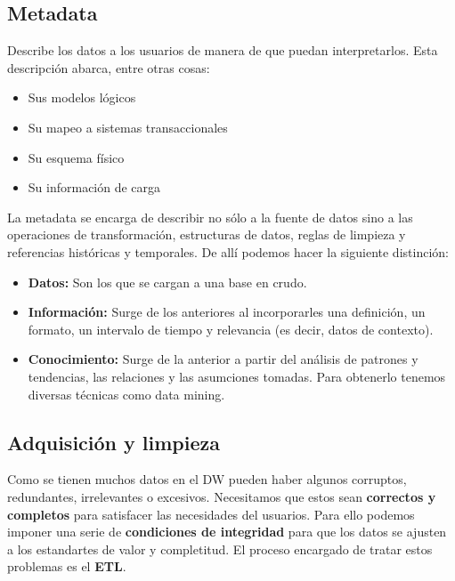 \subsection*{Metadata}
Describe los datos a los usuarios de manera de que puedan interpretarlos. Esta descripción abarca, entre otras cosas:
\begin{itemize}
    \item Sus modelos lógicos
    \item Su mapeo a sistemas transaccionales
    \item Su esquema físico
    \item Su información de carga
\end{itemize}
La metadata se encarga de describir no sólo a la fuente de datos sino a las operaciones de transformación, estructuras de datos, reglas de limpieza y referencias históricas y temporales. De allí podemos hacer la siguiente distinción:
\begin{itemize}
    \item \textbf{Datos:} Son los que se cargan a una base en crudo.
    \item \textbf{Información:} Surge de los anteriores al incorporarles una definición, un formato, un intervalo de tiempo y relevancia (es decir, datos de contexto).
    \item \textbf{Conocimiento:} Surge de la anterior a partir del análisis de patrones y tendencias, las relaciones y las asumciones tomadas. Para obtenerlo tenemos diversas técnicas como data mining.
\end{itemize}

\subsection*{Adquisición y limpieza}
Como se tienen muchos datos en el DW pueden haber algunos corruptos, redundantes, irrelevantes o excesivos. Necesitamos que estos sean \textbf{correctos y completos} para satisfacer las necesidades del usuarios. Para ello podemos imponer una serie de \textbf{condiciones de integridad} para que los datos se ajusten a los estandartes de valor y completitud. El proceso encargado de tratar estos problemas es el \textbf{ETL}.

